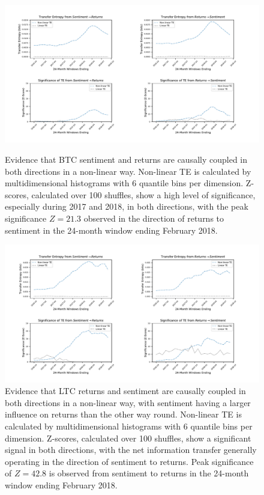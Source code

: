 \documentclass[]{rsos}%
\begin{document}
  \begin{figure}[!htbp]
    \includegraphics[width=\linewidth]{images/BTC.pdf}
    \caption{Evidence that BTC sentiment and returns are causally coupled in both directions in a non-linear way. Non-linear TE is calculated by multidimensional histograms with 6 quantile bins per dimension. Z-scores, calculated over 100 shuffles, show a high level of significance, especially during 2017 and 2018, in both directions, with the peak significance $Z=21.3$ observed in the direction of returns to sentiment in the 24-month window ending February 2018.}
    \label{fig:BTC_TE}
  
    \includegraphics[width=\linewidth]{images/LTC.pdf} 
    \caption{Evidence that LTC returns and sentiment are causally coupled in both directions in a non-linear way, with sentiment having a larger influence on returns than the other way round. Non-linear TE is calculated by multidimensional histograms with 6 quantile bins per dimension. Z-scores, calculated over 100 shuffles, show a significant signal in both directions, with the net information transfer generally operating in the direction of sentiment to returns. Peak significance of $Z=42.8$ is observed from sentiment to returns in the 24-month window ending February 2018.}
    \label{fig:LTC_TE}
    \vspace{-4pt}
  \end{figure}
\end{document}
